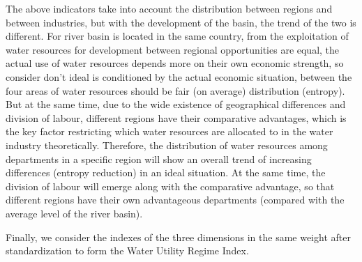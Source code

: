 \documentclass[9pt,twoside,lineno]{pnas-new}
\begin{document}
    The above indicators take into account the distribution between regions and between industries, but with the development of the basin, the trend of the two is different. For river basin is located in the same country, from the exploitation of water resources for development between regional opportunities are equal, the actual use of water resources depends more on their own economic strength, so consider don't ideal is conditioned by the actual economic situation, between the four areas of water resources should be fair (on average) distribution (entropy). But at the same time, due to the wide existence of geographical differences and division of labour, different regions have their comparative advantages, which is the key factor restricting which water resources are allocated to in the water industry theoretically. Therefore, the distribution of water resources among departments in a specific region will show an overall trend of increasing differences (entropy reduction) in an ideal situation. At the same time, the division of labour will emerge along with the comparative advantage, so that different regions have their own advantageous departments (compared with the average level of the river basin).

Finally, we consider the indexes of the three dimensions in the same weight after standardization to form the Water Utility Regime Index.


\end{document}
